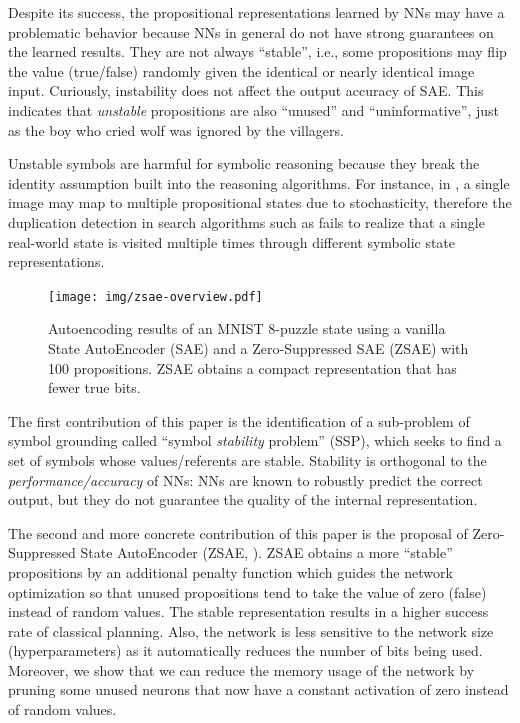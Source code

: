 Despite its success,
the propositional representations learned by NNs may have a problematic behavior
because NNs in general do not have strong guarantees on the learned results.
They are not always ``stable'', i.e.,
some propositions may flip the value (true/false) randomly
given the identical or nearly identical image input.
% 
% 
Curiously, instability does not affect the output accuracy of SAE.
This indicates that \emph{unstable} propositions are also ``unused'' and ``uninformative'',
just as the boy who cried wolf was ignored by the villagers.

Unstable symbols are harmful for symbolic reasoning because
they break the identity assumption built into the reasoning algorithms.
For instance, in \latentplanner, 
a single image may map to multiple propositional states due to stochasticity,
therefore the duplication detection in search algorithms such as \astar \cite{hart1968formal}
fails to realize that a single real-world state is visited multiple times through
different symbolic state representations.

\begin{figure}[tb]
 \centering
 \texttt{[image: img/zsae-overview.pdf]}
 \caption{
Autoencoding results of an MNIST 8-puzzle state
using a vanilla State AutoEncoder (SAE) \cite{Asai2018} and a Zero-Suppressed SAE (ZSAE) with 100 propositions.
ZSAE obtains a compact representation that has fewer true bits.}
 \label{zsae-overview}
\end{figure}

The first contribution of this paper is the identification of a sub-problem of symbol grounding
called ``symbol \emph{stability} problem'' (SSP), which seeks to find a set of symbols
whose values/referents are stable.
Stability is orthogonal to the \emph{performance/accuracy} of NNs:
NNs are known to robustly predict the correct output, but they do not guarantee
the quality of the internal representation.

The second and more concrete contribution of this paper is
the proposal of Zero-Suppressed State AutoEncoder (ZSAE, ).
ZSAE obtains a more ``stable'' propositions
by an additional penalty function which
guides the network optimization so that unused propositions tend to 
take the value of zero (false) instead of random values.
% 
The stable representation results in a higher success rate of classical planning.
Also, the network is less sensitive to the network size (hyperparameters)
as it automatically reduces the number of bits being used.
Moreover, we show that we can reduce the memory usage of the network
by pruning some unused neurons
that now have a constant activation of zero instead of random values.

